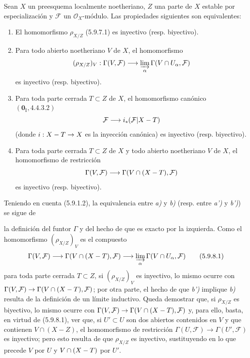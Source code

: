 \begin{proposition}[5.9.8]
Sean $X$ un preesquema localmente noetheriano, $Z$ una parte de $X$ estable
por especialización y $\mathcal F$ un $\mathcal O_X$-módulo. Las propiedades
siguientes son equivalentes:
\begin{enumerate}
\item[\textup{a)}] El homomorfismo $\rho_{X/Z}$ \textup{(5.9.7.1)} es inyectivo
(\textup{resp.} biyectivo).
\item[\textup{b)}] Para todo abierto noetheriano $V$ de $X$, el homomorfismo
\[
(\rho_{X/Z})_V:\Gamma(V,\mathcal F)\longrightarrow
\varinjlim_\alpha\Gamma(V\cap U_\alpha,\mathcal F)
\]
es inyectivo (\textup{resp.} biyectivo).
\item[\textup{a')}] Para toda parte cerrada $T\subset Z$ de $X$, el homomorfismo
canónico $(\mathbf{0}_{\mathrm I},4.4.3.2)$
\[
\mathcal F\longrightarrow i_*(\mathcal F|X- T)
\]
(donde $i:X- T\to X$ es la inyección canónica) es inyectivo
(\textup{resp.} biyectivo).
\item[\textup{b')}] Para toda parte cerrada $T\subset Z$ de $X$ y todo abierto
noetheriano $V$ de $X$, el homomorfismo de restricción
\[
\Gamma(V,\mathcal F)\longrightarrow
\Gamma(V\cap(X- T),\mathcal F)
\]
es inyectivo (\textup{resp.} biyectivo).
\end{enumerate}
\end{proposition}

Teniendo en cuenta (5.9.1.2), la equivalencia entre \emph{a)} y \emph{b)}
(resp. entre \emph{a')} y \emph{b')}) se sigue de

la definición del funtor $\Gamma$ y del hecho de que es exacto por la
izquierda. Como el homomorfismo $(\rho_{X/Z})_V$ es el compuesto
\begin{equation}
\Gamma(V,\mathcal F)\longrightarrow
\Gamma(V\cap(X- T),\mathcal F)\longrightarrow
\varinjlim_\alpha\Gamma(V\cap U_\alpha,\mathcal F)
\tag{5.9.8.1}\label{IV.2.s5.9.8.1-fr}
\end{equation}
para toda parte cerrada $T\subset Z$, si $(\rho_{X/Z})_V$ es inyectivo, lo
mismo ocurre con
$\Gamma(V,\mathcal F)\to\Gamma(V\cap(X- T),\mathcal F)$; por otra parte, el
hecho de que \emph{b')} implique \emph{b)} resulta de la definición de un límite inductivo.
Queda demostrar que, si $\rho_{X/Z}$ es biyectivo, lo mismo ocurre con
$\Gamma(V,\mathcal F)\to\Gamma(V\cap(X- T),\mathcal F)$ y, para ello, basta,
en virtud de (5.9.8.1), ver que, si $U'\subset U$ son dos abiertos contenidos
en $V$ y que contienen $V\cap(X-Z)$, el homomorfismo de restricción
$\Gamma(U,\mathcal F)\to\Gamma(U',\mathcal F)$ es inyectivo; pero esto resulta
de que $\rho_{X/Z}$ es inyectivo, sustituyendo en lo que precede $V$ por $U$
y $V\cap(X- T)$ por $U'$.
